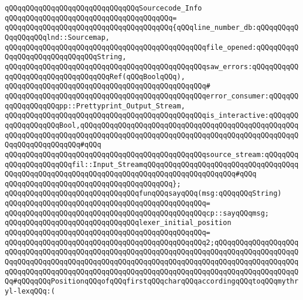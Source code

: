 \verb|qQQqqQQqqQQqqQQqqQQqqQQqqQQqqQQqSourcecode_Info|\newline
\verb|qQQqqQQqqQQqqQQqqQQqqQQqqQQqqQQqqQQqqQQq=|\newline
\verb|qQQqqQQqqQQqqQQqqQQqqQQqqQQqqQQqqQQqqQQq{qQQqline_number_db:qQQqqQQqqQQqqQQqqQQqlnd::Sourcemap,|\newline
\verb|qQQqqQQqqQQqqQQqqQQqqQQqqQQqqQQqqQQqqQQqqQQqqQQqfile_opened:qQQqqQQqqQQqqQQqqQQqqQQqqQQqqQQqString,|\newline
\verb|qQQqqQQqqQQqqQQqqQQqqQQqqQQqqQQqqQQqqQQqqQQqqQQqsaw_errors:qQQqqQQqqQQqqQQqqQQqqQQqqQQqqQQqqQQqRef(qQQqBoolqQQq),|\newline
\verb|qQQqqQQqqQQqqQQqqQQqqQQqqQQqqQQqqQQqqQQqqQQqqQQq#|\newline
\verb|qQQqqQQqqQQqqQQqqQQqqQQqqQQqqQQqqQQqqQQqqQQqqQQqerror_consumer:qQQqqQQqqQQqqQQqqQQqpp::Prettyprint_Output_Stream,|\newline
\verb|qQQqqQQqqQQqqQQqqQQqqQQqqQQqqQQqqQQqqQQqqQQqqQQqis_interactive:qQQqqQQqqQQqqQQqqQQqBool,qQQqqQQqqQQqqQQqqQQqqQQqqQQqqQQqqQQqqQQqqQQqqQQqqQQqqQQqqQQqqQQqqQQqqQQqqQQqqQQqqQQqqQQqqQQqqQQqqQQqqQQqqQQqqQQqqQQqqQQqqQQqqQQqqQQqqQQqqQQq#qQQq|\newline
\verb|qQQqqQQqqQQqqQQqqQQqqQQqqQQqqQQqqQQqqQQqqQQqqQQqsource_stream:qQQqqQQqqQQqqQQqqQQqqQQqfil::Input_StreamqQQqqQQqqQQqqQQqqQQqqQQqqQQqqQQqqQQqqQQqqQQqqQQqqQQqqQQqqQQqqQQqqQQqqQQqqQQqqQQqqQQqqQQqqQQq#qQQq|\newline
\verb|qQQqqQQqqQQqqQQqqQQqqQQqqQQqqQQqqQQqqQQq};|\newline
\newline
\verb|qQQqqQQqqQQqqQQqqQQqqQQqqQQqqQQqfunqQQqsayqQQq(msg:qQQqqQQqString)|\newline
\verb|qQQqqQQqqQQqqQQqqQQqqQQqqQQqqQQqqQQqqQQqqQQqqQQq=|\newline
\verb|qQQqqQQqqQQqqQQqqQQqqQQqqQQqqQQqqQQqqQQqqQQqqQQqcp::sayqQQqmsg;|\newline
\newline
\newline
\verb|qQQqqQQqqQQqqQQqqQQqqQQqqQQqqQQqlexer_initial_position|\newline
\verb|qQQqqQQqqQQqqQQqqQQqqQQqqQQqqQQqqQQqqQQqqQQqqQQq=|\newline
\verb|qQQqqQQqqQQqqQQqqQQqqQQqqQQqqQQqqQQqqQQqqQQqqQQq2;qQQqqQQqqQQqqQQqqQQqqQQqqQQqqQQqqQQqqQQqqQQqqQQqqQQqqQQqqQQqqQQqqQQqqQQqqQQqqQQqqQQqqQQqqQQqqQQqqQQqqQQqqQQqqQQqqQQqqQQqqQQqqQQqqQQqqQQqqQQqqQQqqQQqqQQqqQQqqQQqqQQqqQQqqQQqqQQqqQQqqQQqqQQqqQQqqQQqqQQqqQQqqQQqqQQqqQQqqQQqqQQqqQQqqQQq#qQQqqQQqPositionqQQqofqQQqfirstqQQqcharqQQqaccordingqQQqtoqQQqmythryl-lexqQQq:(|\newline

